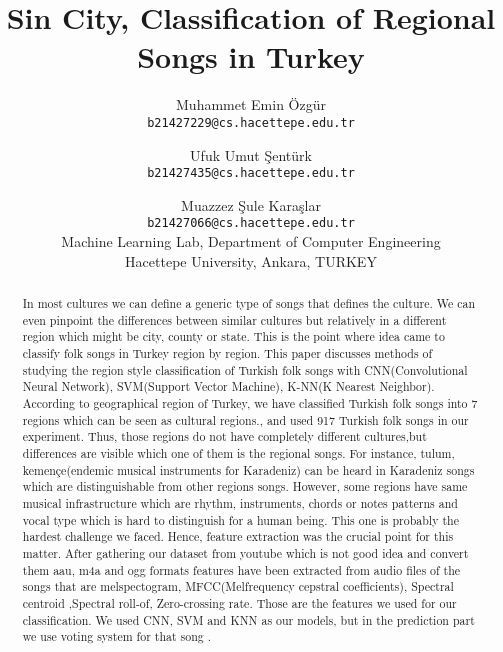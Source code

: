 \documentclass[10pt,twocolumn,letterpaper]{article}
\begin{document}
  
  \title{Sin City, Classification of Regional Songs in Turkey}
  
  \author{Muhammet Emin Özgür\\
  {\tt\small b21427229@cs.hacettepe.edu.tr}
  \and
  Ufuk Umut Şentürk\\
  {\tt\small b21427435@cs.hacettepe.edu.tr} \\
  \and
  Muazzez Şule Karaşlar\\
  {\tt\small b21427066@cs.hacettepe.edu.tr}\\
  {Machine Learning Lab, Department of Computer Engineering}\\
  {Hacettepe University, Ankara, TURKEY}\\
  }
  
  \maketitle
  \begin{abstract}
    In most cultures we can define a generic type of songs that defines the culture. We can even pinpoint the differences between similar cultures but relatively in a different region which might be city, county or state. This is the point where idea came to classify folk songs in Turkey region by region. This paper discusses methods of studying the region style classification of Turkish folk songs with CNN(Convolutional Neural Network), SVM(Support Vector Machine), K-NN(K Nearest Neighbor). According to geographical region of Turkey, we have classified Turkish folk songs into 7 regions which can be seen
    as cultural regions., and used 917 Turkish folk songs in our experiment. Thus, those regions do not have completely different cultures,but differences are visible which one of them is the regional songs. For instance, tulum, kemençe(endemic musical instruments for Karadeniz) can be heard in Karadeniz songs which are distinguishable from other regions songs. However, some regions have same musical infrastructure which are rhythm, instruments, chords or notes patterns and vocal type which is hard to distinguish for a human being. This one is probably the hardest challenge we faced. Hence, feature extraction was the crucial point for this matter. After gathering our dataset from youtube which is not good idea and convert them aau, m4a and ogg formats features have been extracted from audio files of the songs that are melspectogram, MFCC(Melfrequency cepstral coefficients), Spectral centroid ,Spectral roll-of, Zero-crossing rate. Those are the features we used for our classification. We used CNN, SVM and KNN as our models, but in the prediction part we use voting system for that song .
  \end{abstract}
\end{document}
